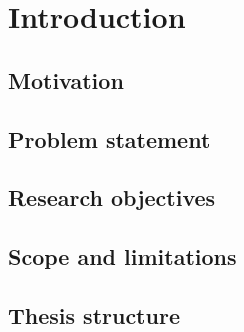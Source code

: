 \chapter{Introduction}
\label{ch:introduction}

\section{Motivation}

\section{Problem statement}

\section{Research objectives}

\section{Scope and limitations}

\section{Thesis structure}
